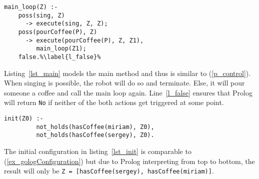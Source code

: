 \begin{lstlisting}[firstnumber=10, caption={Main method which either tells the robot to sing or to pour coffee.}, label=lst_main]
  main_loop(Z) :-
    poss(sing, Z)
      -> execute(sing, Z, Z);
    poss(pourCoffee(P), Z)
      -> execute(pourCoffee(P), Z, Z1),
         main_loop(Z1);
    false.%\label{l_false}%
\end{lstlisting}
Listing~\ref{lst_main} models the main method and thus is similar to (\ref{p_control}). When singing is possible, the robot will do so and terminate. Else, it will pour someone a coffee and call the main loop again. Line~\ref{l_false} ensures that Prolog will return \texttt{No} if neither of the both actions get triggered at some point.
\begin{lstlisting}[firstnumber=17, caption={Initial configuration.}, label=lst_init]
  init(Z0) :-
         not_holds(hasCoffee(miriam), Z0),
         not_holds(hasCoffee(sergey), Z0).
\end{lstlisting}
The initial configuration in listing~\ref{lst_init} is comparable to (\ref{ex_gologConfiguration}) but due to Prolog interpreting from top to bottom, the result will only be \texttt{Z = [hasCoffee(sergey), hasCoffee(miriam)]}.
